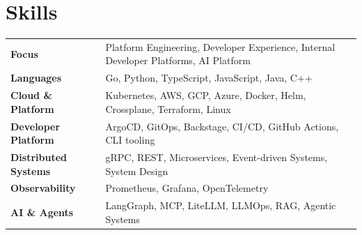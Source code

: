 \documentclass[letterpaper,11pt]{article}
\begin{document}
\section{Skills}
\begin{small}
\begin{tabularx}{\textwidth}{@{}p{3.6cm}X@{}}
\textbf{Focus} & Platform Engineering, Developer Experience, Internal Developer Platforms, AI Platform \\
\textbf{Languages} & Go, Python, TypeScript, JavaScript, Java, C++ \\
\textbf{Cloud \& Platform} & Kubernetes, AWS, GCP, Azure, Docker, Helm, Crossplane, Terraform, Linux \\
\textbf{Developer Platform} & ArgoCD, GitOps, Backstage, CI/CD, GitHub Actions, CLI tooling \\
\textbf{Distributed Systems} & gRPC, REST, Microservices, Event-driven Systems, System Design \\
\textbf{Observability} & Prometheus, Grafana, OpenTelemetry \\
\textbf{AI \& Agents} & LangGraph, MCP, LiteLLM, LLMOps, RAG, Agentic Systems \\
\end{tabularx}
\end{small}
\end{document}
